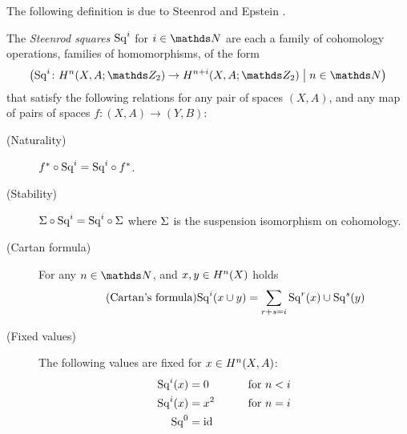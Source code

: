 The following definition is due to
Steenrod and Epstein \cite[Chap.~I.1, p.~1]{steenrodepstein}.
\begin{Def}\label{def:sq}
  The \emph{Steenrod squares} $\mathrm{Sq}^{i}$ for $i\in\Nat$ are each a family
  of cohomology operations, \idest families of homomorphisms, of the
  form
  \begin{gather*}
    \left(
      \Sq i\colon \H^n(X, A;\Zmod2) \to \H^{n+i}(X, A;\Zmod2)
      \middlemid
      n\in\Nat
    \right)
  \end{gather*}
  that satisfy the following relations for any pair of spaces $(X,A)$, and any map of
  pairs of spaces $f\colon (X,A)\to (Y,B)$:
  \begin{description}
  \item[(Naturality)]\label{item:sqnaturality}
    ${f}^*\circ\mathrm{Sq}^{i} = \mathrm{Sq}^{i}\circ{f}^*$.
  \item[(Stability)]\label{item:sqstability}
    $\Sigma\circ\mathrm{Sq}^{i} = \mathrm{Sq}^{i}\circ\Sigma$
    where $\Sigma$ is the suspension isomorphism on cohomology.
  \item[(Cartan formula)] For any $n\in\Nat$, and $x,y\in H^n(X)$ holds
    \begin{gather}\label{tag:cartan}\tag{Cartan's formula}
      \mathrm{Sq}^{i}(x\cup y) = \sum_{r+s=i}\mathrm{Sq}^{r}(x)\cup\mathrm{Sq}^{s}(y)
    \end{gather}
  \item[(Fixed values)] The following values are fixed for $x\in H^n(X,A)$:
    \begin{alignat}{4}
      \mathrm{Sq}^{i}(x) &= 0     & \qquad\text{for }n<i \label{eq:sqlowerbound}\\
      \mathrm{Sq}^{i}(x) &= x^2   & \qquad\text{for }n=i \label{eq:sqsquared}\\
      \mathrm{Sq}^{0}    &= \mathrm{id}_{}   \label{eq:sqidentity}
    \end{alignat}

\end{description}
\end{Def}
